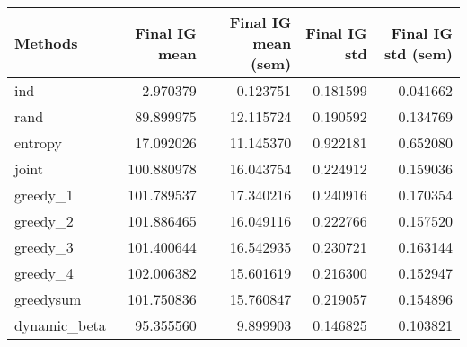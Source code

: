 \begin{tabular}{lrrrr}
\toprule
      Methods &  Final IG mean &  Final IG mean (sem) &  Final IG std &  Final IG std (sem) \\
\midrule
          ind &       2.970379 &             0.123751 &      0.181599 &            0.041662 \\
         rand &      89.899975 &            12.115724 &      0.190592 &            0.134769 \\
      entropy &      17.092026 &            11.145370 &      0.922181 &            0.652080 \\
        joint &     100.880978 &            16.043754 &      0.224912 &            0.159036 \\
     greedy\_1 &     101.789537 &            17.340216 &      0.240916 &            0.170354 \\
     greedy\_2 &     101.886465 &            16.049116 &      0.222766 &            0.157520 \\
     greedy\_3 &     101.400644 &            16.542935 &      0.230721 &            0.163144 \\
     greedy\_4 &     102.006382 &            15.601619 &      0.216300 &            0.152947 \\
    greedysum &     101.750836 &            15.760847 &      0.219057 &            0.154896 \\
 dynamic\_beta &      95.355560 &             9.899903 &      0.146825 &            0.103821 \\
\bottomrule
\end{tabular}
